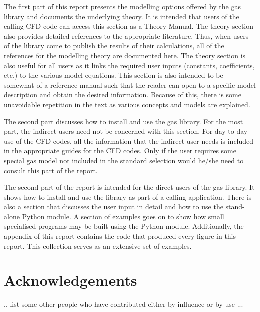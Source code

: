 The first part of this report presents the modelling options offered
by the gas library and documents the underlying theory.
It is intended that users of the calling CFD code can access this
section as a Theory Manual.
The theory section also provides detailed references to the appropriate
literature.
Thus, when users of the library come to publish the results of their
calculations, all of the references for the modelling theory are
documented here.
The theory section is also useful for all users
as it links the required user inputs (constants, coefficients, etc.)
to the various model equations.
This section is also intended to be somewhat of a reference manual
such that the reader can open to a specific model description
and obtain the desired information.
Because of this, there is some unavoidable repetition in the
text as various concepts and models are explained.

The second part discusses how to install and use the gas library.
For the most part, the indirect users need not be concerned with this
section.
For day-to-day use of the CFD codes, all the information that the
indirect user needs is included in the appropriate guides for the
CFD codes.
Only if the user requires some special gas model not included in
the standard selection would he/she need to consult this part
of the report.

The second part of the report is intended for the direct users of the gas library.
It shows how to install and use the library as part of a calling application.
There is also a section that discusses the user input in detail and how
to use the stand-alone Python module.
A section of examples goes on to show how small specialised programs
may be built using the Python module.
Additionally, the appendix of this report contains the code that produced
every figure in this report.
This collection serves as an extensive set of examples.

\section*{Acknowledgements}
.. list some other people who have contributed either by influence or by use ...








